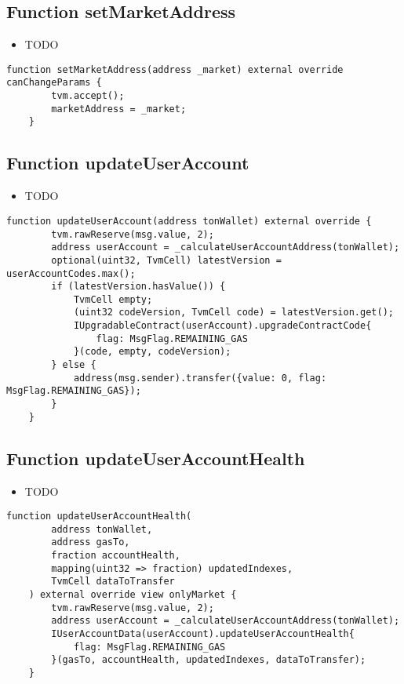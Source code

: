 \subsection{Function setMarketAddress}

\noindent\begin{itemize}
\item TODO
\end{itemize}

\begin{lstlisting}[firstnumber=493]
    function setMarketAddress(address _market) external override canChangeParams {
        tvm.accept();
        marketAddress = _market;
    }
\end{lstlisting}

\subsection{Function updateUserAccount}

\noindent\begin{itemize}
\item TODO
\end{itemize}

\begin{lstlisting}[firstnumber=506]
    function updateUserAccount(address tonWallet) external override {
        tvm.rawReserve(msg.value, 2);
        address userAccount = _calculateUserAccountAddress(tonWallet);
        optional(uint32, TvmCell) latestVersion = userAccountCodes.max();
        if (latestVersion.hasValue()) {
            TvmCell empty;
            (uint32 codeVersion, TvmCell code) = latestVersion.get();
            IUpgradableContract(userAccount).upgradeContractCode{
                flag: MsgFlag.REMAINING_GAS
            }(code, empty, codeVersion);
        } else {
            address(msg.sender).transfer({value: 0, flag: MsgFlag.REMAINING_GAS});
        }
    }
\end{lstlisting}

\subsection{Function updateUserAccountHealth}

\noindent\begin{itemize}
\item TODO
\end{itemize}

\begin{lstlisting}[firstnumber=459]
    function updateUserAccountHealth(
        address tonWallet, 
        address gasTo,
        fraction accountHealth, 
        mapping(uint32 => fraction) updatedIndexes,
        TvmCell dataToTransfer
    ) external override view onlyMarket {
        tvm.rawReserve(msg.value, 2);
        address userAccount = _calculateUserAccountAddress(tonWallet);
        IUserAccountData(userAccount).updateUserAccountHealth{
            flag: MsgFlag.REMAINING_GAS
        }(gasTo, accountHealth, updatedIndexes, dataToTransfer);
    }
\end{lstlisting}


